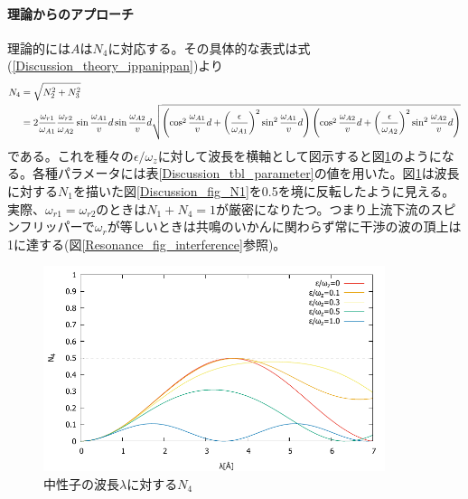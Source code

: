 \paragraph{理論からのアプローチ}
理論的には$A$は$N_4$に対応する。その具体的な表式は式(\ref{Discussion_theory_ippanippan})より
\begin{align}
N_4&=\sqrt{N_2^2+N_3^2} \notag \\
&=2\frac{\omega_{r1}}{\omega_{A1}}\frac{\omega_{r2}}{\omega_{A2}}\sin\frac{\omega_{A1}}{v}d\sin\frac{\omega_{A2}}{v}d\sqrt{\left(\cos^2 \frac{\omega_{A1}}{v}d +\left(\frac{\epsilon}{\omega_{A1}}\right)^2\sin^2 \frac{\omega_{A1}}{v}d\right)\left(\cos^2 \frac{\omega_{A2}}{v}d+\left(\frac{\epsilon}{\omega_{A2}}\right)^2 \sin^2 \frac{\omega_{A2}}{v}d\right)}
\end{align}
である。これを種々の$\epsilon/\omega_z$に対して波長を横軸として図示すると図\ref{Discussion_fig_N4}のようになる。各種パラメータには表\ref{Discussion_tbl_parameter}の値を用いた。図\ref{Discussion_fig_N4}は波長に対する$N_1$を描いた図\ref{Discussion_fig_N1}を0.5を境に反転したように見える。実際、$\omega_{r1}=\omega_{r2}$のときは$N_1+N_4=1$が厳密になりたつ。つまり上流下流のスピンフリッパーで$\omega_r$が等しいときは共鳴のいかんに関わらず常に干渉の波の頂上は1に達する(図\ref{Resonance_fig_interference}参照)。
\begin{figure}[H]
\centering
\includegraphics[width=10cm]{discussion/A/N4.pdf}
\caption{中性子の波長$\lambda$に対する$N_4$}\label{Discussion_fig_N4}
\end{figure}

